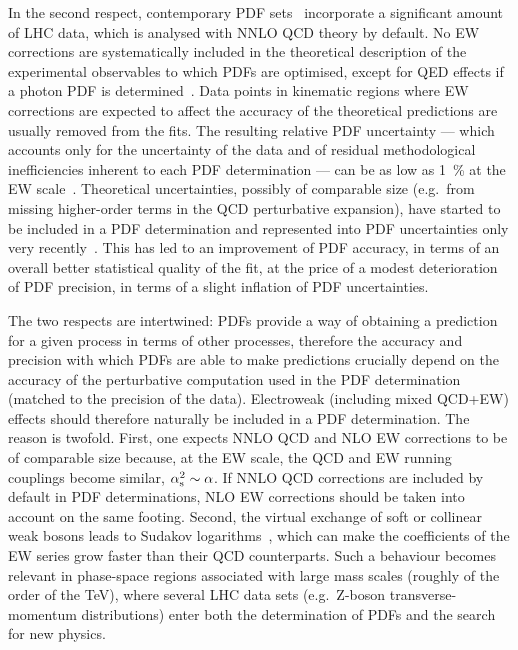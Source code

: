 In the second respect, contemporary PDF
sets~\cite{Harland-Lang:2014zoa,Ball:2017nwa,Hou:2019efy}
incorporate a significant amount of LHC data, which is analysed with NNLO QCD 
theory by default. No EW corrections are systematically included in the 
theoretical description of the experimental observables to which PDFs are 
optimised, except for QED effects if a photon PDF is 
determined~\cite{Schmidt:2015zda,Manohar:2016nzj,Manohar:2017eqh,Bertone:2017bme,Harland-Lang:2019pla}.
Data points in kinematic regions where EW corrections are expected to affect
the accuracy of the theoretical predictions are usually removed from the fits.
The resulting relative PDF uncertainty --- which accounts only for the
uncertainty of the data and of residual methodological inefficiencies inherent to 
each PDF determination --- can be as low as \SI{1}{\percent} at the EW
scale~\cite{Ball:2017nwa}. Theoretical uncertainties, possibly of comparable 
size (e.g.\ from missing higher-order terms in the QCD perturbative
expansion), have started to be included in a PDF determination and represented 
into PDF uncertainties only very 
recently~\cite{AbdulKhalek:2019bux,AbdulKhalek:2019ihb}. This has led to an 
improvement of PDF accuracy, in terms of an overall
better statistical quality of the fit, at the price of a modest deterioration 
of PDF precision, in terms of a slight inflation of PDF uncertainties.

The two respects are intertwined: PDFs provide a way of obtaining a prediction
for a given process in terms of other processes, therefore the accuracy and 
precision with which PDFs are able to make predictions crucially depend on 
the accuracy of the perturbative computation used in the PDF determination
(matched to the precision of the data). Electroweak (including mixed QCD+EW) 
effects should therefore naturally be included in a PDF determination. The 
reason is twofold. First, one expects NNLO QCD and NLO EW corrections to be of 
comparable size because, at the EW scale, the QCD and EW running couplings 
become similar, $\alpha_\mathrm{s}^2\sim \alpha$. If NNLO QCD corrections are included
by default in PDF determinations, NLO EW corrections should be
taken into account on the same footing. Second, the virtual exchange of soft or 
collinear weak bosons leads to Sudakov 
logarithms~\cite{Denner:2000jv,Denner:2001gw},
which can make the coefficients of the EW series grow faster than 
their QCD counterparts. Such a behaviour becomes relevant in
phase-space regions associated with large mass scales (roughly of the order
of the \si{\tera\electronvolt}), where several LHC data sets (e.g.\ Z-boson
transverse-momentum distributions) enter both the determination of PDFs and the search
for new physics.

